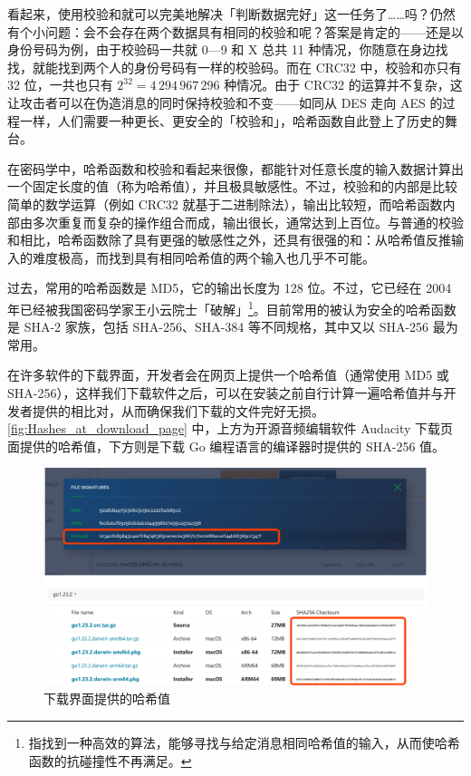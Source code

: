 看起来，使用校验和就可以完美地解决「判断数据完好」这一任务了……吗？仍然有个小问题：会不会存在两个数据具有相同的校验和呢？答案是肯定的——还是以身份号码为例，由于校验码一共就 0—9 和 X 总共 11 种情况，你随意在身边找找，就能找到两个人的身份号码有一样的校验码。而在 CRC32 中，校验和亦只有 32 位，一共也只有 $2^{32}=4\,294\,967\,296$ 种情况。由于 CRC32 的运算并不复杂，这让攻击者可以在伪造消息的同时保持校验和不变——如同从 DES 走向 AES 的过程一样，人们需要一种更长、更安全的「校验和」，哈希函数自此登上了历史的舞台。

在密码学中，哈希函数和校验和看起来很像，都能针对任意长度的输入数据计算出一个固定长度的值（称为哈希值），并且极具敏感性。不过，校验和的内部是比较简单的数学运算（例如 CRC32 就基于二进制除法），输出比较短，而哈希函数内部由多次重复而复杂的操作组合而成，输出很长，通常达到上百位。与普通的校验和相比，哈希函数除了具有更强的敏感性之外，还具有很强的和：从哈希值反推输入的难度极高，而找到具有相同哈希值的两个输入也几乎不可能。

过去，常用的哈希函数是 MD5，它的输出长度为 128 位。不过，它已经在 2004 年已经被我国密码学家王小云院士「破解」\footnote{指找到一种高效的算法，能够寻找与给定消息相同哈希值的输入，从而使哈希函数的抗碰撞性不再满足。}。目前常用的被认为安全的哈希函数是 SHA-2 家族，包括 SHA-256、SHA-384 等不同规格，其中又以 SHA-256 最为常用。

在许多软件的下载界面，开发者会在网页上提供一个哈希值（通常使用 MD5 或 SHA-256），这样我们下载软件之后，可以在安装之前自行计算一遍哈希值并与开发者提供的相比对，从而确保我们下载的文件完好无损。\autoref{fig:Hashes_at_download_page} 中，上方为开源音频编辑软件 Audacity 下载页面提供的哈希值，下方则是下载 Go 编程语言的编译器时提供的 SHA-256 值。

\begin{figure}[htb!]
  \centering
  \includegraphics[width=.7\textwidth]{assets/surpass/Hashes_at_download_page.png}
  \caption{下载界面提供的哈希值}
  \label{fig:Hashes_at_download_page}
\end{figure}

